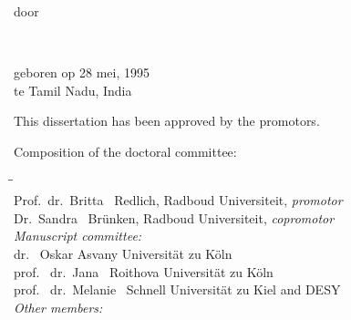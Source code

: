 \begin{titlepage}
\begin{center}
        \bigskip
        \bigskip

        door

        \bigskip
        \bigskip

        \makeatletter
        {\Large\titlefont\bfseries\@firstnames\ \MakeUppercase{\titleshape\@lastname}}
        \makeatother

        \bigskip
        \bigskip

        geboren op 28 mei, 1995\\
        te Tamil Nadu, India\\

        \vspace*{2\bigskipamount}

    \end{center}

    \clearpage
    \thispagestyle{empty}

    \noindent This dissertation has been approved by the promotors.

    \bigskip
    \noindent Composition of the doctoral committee:
    
    \begin{tabbing}
        \hspace{\tabcolsep}\=\hspace{0.33\textwidth}\=\hspace{0.66\textwidth}                   \\[-3\medskipamount]
        \> Prof.\ dr.\ Britta \ Redlich,    \> Radboud Universiteit, \textit{promotor}      \\
        \> Dr.\ Sandra \ Br\"unken,        \> Radboud Universiteit, \textit{copromotor}    \\[\medskipamount]
        \>\textit{Manuscript committee:}  \\[\smallskipamount]
        \> dr. \ Oskar Asvany            \> Universit\"at zu K\"oln \\
        \> prof. \ dr.\ Jana \ Roithova            \> Universit\"at zu K\"oln \\
        \> prof. \ dr.\ Melanie \ Schnell   \> Universit\"at zu Kiel and DESY \\[\medskipamount]
        \>\textit{Other members:} \\[\smallskipamount]
    \end{tabbing}


\end{titlepage}
